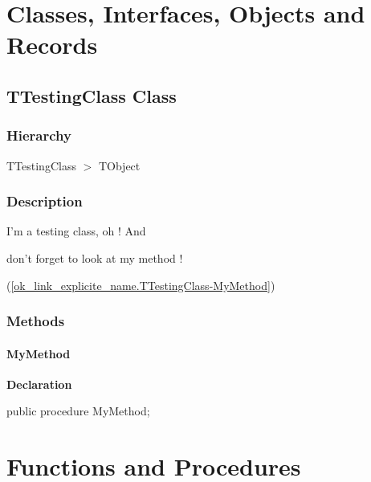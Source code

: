 \documentclass{report}
\begin{document}
\section{Classes, Interfaces, Objects and Records}
\subsection*{TTestingClass Class}
\subsubsection*{\large{\textbf{Hierarchy}}\normalsize\hspace{1ex}\hfill}
TTestingClass {$>$} TObject
\subsubsection*{\large{\textbf{Description}}\normalsize\hspace{1ex}\hfill}
I'm a testing class, oh ! And \begin{ttfamily}don't forget to look at my method !\end{ttfamily}(\ref{ok_link_explicite_name.TTestingClass-MyMethod})\subsubsection*{\large{\textbf{Methods}}\normalsize\hspace{1ex}\hfill}
\paragraph*{MyMethod}\hspace*{\fill}

\begin{list}{}{
\setlength{\itemindent}{0cm}
\setlength{\listparindent}{0cm}
\setlength{\leftmargin}{\evensidemargin}
\addtolength{\leftmargin}{\tmplength}
\settowidth{\labelsep}{X}
\addtolength{\leftmargin}{\labelsep}
\setlength{\labelwidth}{\tmplength}
}
\begin{flushleft}
\item[\textbf{Declaration}\hfill]
\begin{ttfamily}
public procedure MyMethod;\end{ttfamily}


\end{flushleft}
\end{list}
\section{Functions and Procedures}
\end{document}
